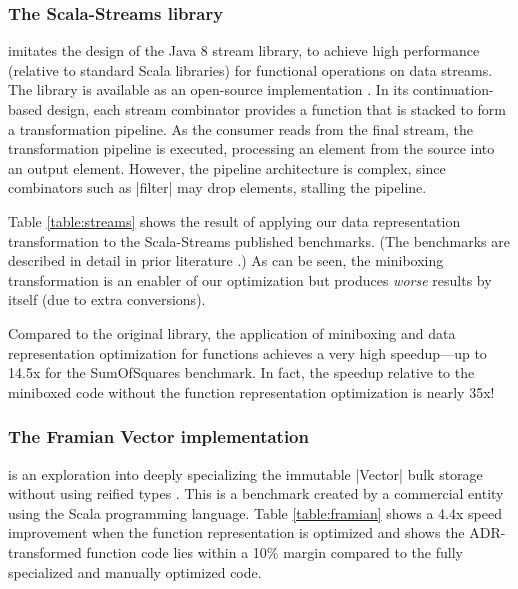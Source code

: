 \subsubsection{The Scala-Streams library} \cite{biboudis_clash_2014} imitates the design of the Java 8 stream library, to achieve high performance (relative to standard Scala libraries) for functional operations on data streams. The library is available as an open-source implementation \cite{biboudis-streams}. In its continuation-based design, each stream combinator provides a function that is stacked to form a transformation pipeline. As the consumer reads from the final stream, the transformation pipeline is executed, processing an element from the source into an output element. However, the pipeline architecture is complex, since combinators such as |filter| may drop elements, stalling the pipeline.

Table \ref{table:streams} shows the result of applying our data
representation transformation to the Scala-Streams published
benchmarks. (The benchmarks are described in detail in prior
literature \cite{biboudis_clash_2014}.) As can be seen, the miniboxing
transformation is an enabler of our optimization but produces
\emph{worse} results by itself (due to extra conversions).

Compared to the original library, the application of miniboxing and
data representation optimization for functions achieves a very high
speedup---up to 14.5x for the SumOfSquares benchmark. In fact, the
speedup relative to the miniboxed code without the function
representation optimization is nearly 35x!



\subsubsection{The Framian Vector implementation} is an exploration into deeply specializing the immutable |Vector| bulk storage without using reified types \cite{tixxit-respecialization15,tixxit-respecialization6}. This is a benchmark created by a commercial entity using the Scala programming language. Table \ref{table:framian} shows a 4.4x speed improvement when the function representation is optimized and shows the ADR-transformed function code lies within a 10\% margin compared to the fully specialized and manually optimized code.

